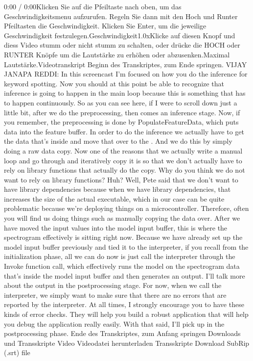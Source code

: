     0:00 / 0:00Klicken Sie auf die Pfeiltaste nach oben, um das Geschwindigkeitsmenu aufzurufen. Regeln Sie dann mit den Hoch und Runter Pfeiltasten die Geschwindigkeit. Klicken Sie Enter, um die jeweilige Geschwindigkeit festzulegen.Geschwindigkeit1.0xKlicke auf diesen Knopf und diess Video stumm oder nicht stumm zu schalten, oder drücke die HOCH oder RUNTER Knöpfe um die Lautstärke zu erhöhen oder abzusenken.Maximal Lautstärke.Videotranskript
    Beginn des Transkriptes, zum Ende springen.
    VIJAY JANAPA REDDI: In this screencast I'm
    focused on how you do the inference for keyword spotting.
    Now you should at this point be able to recognize
    that inference is going to happen in the main loop
    because this is something that has to happen continuously.
    So as you can see here, if I were to scroll down just a little bit,
    after we do the preprocessing, then comes an inference stage.
    Now, if you remember, the preprocessing is
    done by PopulateFeatureData, which puts data into the feature buffer.
    In order to do the inference we actually have to get the data that's inside
     and move that over to the .
    And we do this by simply doing a raw data copy.
    Now one of the reasons that we actually write a manual loop
    and go through and iteratively copy it is
    so that we don't actually have to rely on library functions that
    actually do the copy.
    Why do you think we do not want to rely on library functions?
    Huh?
    Well, Pete said that we don't want to have library dependencies because when
    we have library dependencies, that increases
    the size of the actual executable, which in our case
    can be quite problematic because we're deploying things on a microcontroller.
    Therefore, often you will find us doing things
    such as manually copying the data over.
    After we have moved the input values into the model input buffer,
    this is where the spectrogram effectively is sitting right now.
    Because we have already set up the model input buffer previously
    and tied it to the interpreter, if you recall from the initialization phase,
    all we can do now is just call the interpreter through the Invoke function
    call, which effectively runs the model on the spectrogram
    data that's inside the model input buffer and then generates an output.
    I'll talk more about the output in the postprocessing stage.
    For now, when we call the interpreter, we simply
    want to make sure that there are no errors that
    are reported by the interpreter.
    At all times, I strongly encourage you to have these kinds of error checks.
    They will help you build a robust application that will help you
    debug the application really easily.
    With that said, I'll pick up in the postprocessing phase.
    Ende des Transkriptes, zum Anfang springen
    Downloads und Transskripte
    Video
    Videodatei herunterladen
    Transskripte
    Download SubRip (.srt) file
    
